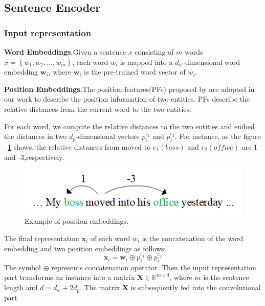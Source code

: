 \documentclass[conference]{IEEEtran}
\begin{document}
\subsection{Sentence Encoder} 
\label{sect:encoder} 
\subsubsection*{Input representation}

\textbf{Word Embeddings.}Given a sentence $x$ consisting of $m$ words $x = \left \{w_{1}, w_{2}, ..., w_{m}  \right \}$, each word $w_{i}$ is mapped into a $d_{w}$-dimensional word embedding $\mathbf{w}_i$, where $\mathbf{w}_i$ is the pre-trained word vector of $w_{i}$.

\textbf{Position Embeddings.}The position features(PFs) proposed by \cite{zeng2014relation} are adopted in our work to describe the position information of two entities.
PFs describe the relative distances from the current word to the two entities.

For each word, we compute the relative distances to the two entities and embed the distances in two $d_{p}$-dimensional vectors $p_{i}^{e_{1}}$ and $p_{i}^{e_{2}}$.
For instance, as the figure ~\ref{PF} shows, the relative distances from moved to $e_{1}(boss)$ and $e_{2}(office)$ are 1 and -3,respectively.

\begin{figure}[h]
  \includegraphics[]{postion.png}
  \caption{Example of position embeddings.}
  \label{PF}
\end{figure}

The final representation $\mathbf{x}_i$ of each word $w_{i}$ is the concatenation of the word embedding and two position embeddings as follows:
\begin{equation}
  \mathbf{x}_i = \mathbf{w}_i \oplus p_{i}^{e_{1}}\oplus p_{i}^{e_{2}}
\end{equation}
The symbol $\oplus$ represents concatenation operator.
Then the input representation part transforms an instance into a matrix $\mathbf{X}\in \mathbb{R}^{m \times d}$, where $m$ is the sentence length and $d = d_{w}+2d_{p}$.
The matrix $\mathbf{X}$ is subsequently fed into the convolutional part.
\end{document}
